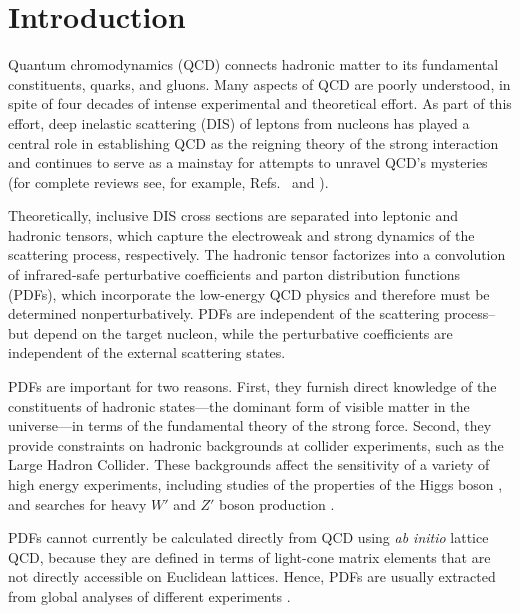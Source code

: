 \section{Introduction}

Quantum chromodynamics (QCD) connects hadronic matter to its fundamental 
constituents, quarks, and gluons. Many aspects of QCD are poorly understood, in 
spite of four decades of intense 
experimental and theoretical effort. As part of this effort, deep inelastic 
scattering (DIS) of leptons from nucleons has played a central role in 
establishing QCD as the reigning theory of the strong interaction and continues 
to serve as a mainstay for attempts to unravel QCD's mysteries 
(for complete reviews see, for example, Refs.~\cite{pdg12} and 
\cite{Collins:2011zzd}).

Theoretically, inclusive DIS cross sections are 
separated into leptonic and hadronic tensors, which capture the 
electroweak and strong dynamics of the scattering process, respectively. The 
hadronic tensor factorizes into a convolution of infrared-safe perturbative 
coefficients and parton distribution functions (PDFs), 
which incorporate the low-energy QCD physics and therefore must be determined 
nonperturbatively. PDFs are independent of the scattering process--but 
depend on the target nucleon, while the perturbative coefficients are 
independent of the external scattering states.

PDFs are important for two reasons. First, they furnish 
direct knowledge of the constituents of hadronic states---the dominant form of 
visible matter in the universe---in terms of the fundamental theory of the 
strong force. Second, they provide constraints on hadronic 
backgrounds at collider experiments, such as the Large Hadron Collider. 
These backgrounds affect the sensitivity of a variety of high energy 
experiments, including studies of the properties of the Higgs boson 
\cite{Thorne:2011kq,Alekhin:2010dd,Alekhin:2011ey}, and searches for heavy $W'$ 
and $Z'$ boson production \cite{Brady:2011hb}.

PDFs cannot currently be calculated directly from QCD using \emph{ab 
initio} lattice QCD, because they are defined 
in terms of light-cone matrix elements that are not directly 
accessible on Euclidean lattices. Hence, PDFs
are usually extracted from global analyses of different experiments  
\cite{Jimenez-Delgado:2014xza,Jimenez-Delgado:2013boa,Ball:2013lla,
Arbabifar:2013tma,Owens:2012bv,Accardi:2011fa,Leader:2010rb,Blumlein:2010rn, 
Hirai:2008aj}. 

